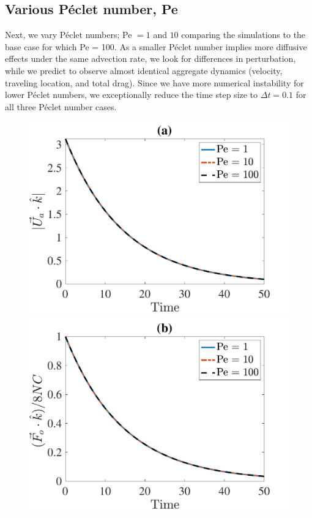 \subsection{Various Péclet number, Pe}
Next, we vary Péclet numbers; Pe $=1$ and $ 10$ comparing the simulations to the base case for which Pe = 100.  As a smaller Péclet number 
implies more diffusive effects under the same advection rate, we look for differences in perturbation, while we predict to observe almost identical aggregate dynamics (velocity, traveling location, and total drag). 
Since we have more numerical instability for lower Péclet numbers, we exceptionally reduce the time step size to $\Delta t = 0.1$ for all three Péclet number cases.
\begin{figure}[ht]
	\begin{center}
		\includegraphics[scale=0.35]{./figures/fig_NC50_Pe_Ua3_all}
		\includegraphics[scale=0.35]{./figures/fig_NC50_Pe_Fo3_all}

\end{center}
\end{figure}
